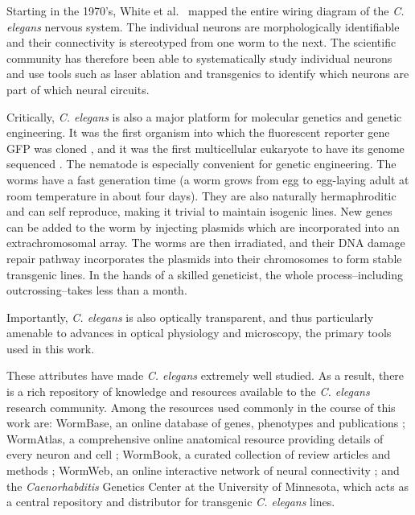 Starting in the 1970's, White et al.~\citep{white_structure_1976, white_structure_1986}  mapped the entire wiring diagram of the \textit{C. elegans} nervous system. The individual neurons are morphologically identifiable and their connectivity is stereotyped from one worm to the next. The  scientific community has therefore been able to systematically study individual neurons and use tools such as laser ablation and transgenics to identify which neurons are part of which neural circuits. 

Critically, \textit{C. elegans} is also a major platform for molecular genetics and genetic engineering. It was the first organism into which the fluorescent reporter gene GFP was cloned \citep{chalfie_green_1994},  and it was the first multicellular eukaryote to have its genome sequenced \citep{sulston_c._1992,_genome_1998}. The nematode is especially convenient for genetic engineering. The worms have a fast generation time (a worm grows from egg to egg-laying adult at room temperature in about four days).  They are also naturally hermaphroditic and can self reproduce,  making it trivial to maintain isogenic lines. New genes can be added to the worm by injecting plasmids which are incorporated into an extrachromosomal array. The worms are then irradiated, and their DNA damage repair pathway incorporates the plasmids into their chromosomes to form stable transgenic lines.  In the hands of a skilled geneticist, the whole process--including outcrossing--takes less than a month. 

Importantly, \textit{C. elegans} is also optically transparent, and thus particularly amenable to advances in optical physiology and microscopy,  the primary tools used in this work. 

These attributes have made  \textit{C. elegans}  extremely well studied.  As a result, there is a rich repository of knowledge and resources available to the \textit{C. elegans} research community. Among the resources used commonly in the course of this work are:  WormBase, an online database of genes, phenotypes and publications \citep{harris_wormbase:_2010}; WormAtlas, a comprehensive online anatomical resource providing details of every neuron and cell \citep{altun_wormatlas_2002}; WormBook, a curated collection of review articles and methods \citep{the_c._elegans_research_community_wormbook_2011}; WormWeb, an online interactive network of neural connectivity \citep{bhatla_c._2009};  and the \textit{Caenorhabditis} Genetics Center at the University of Minnesota, which acts as a central repository and distributor for transgenic \textit{C. elegans} lines.


